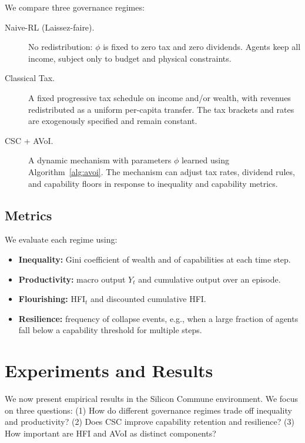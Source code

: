 \documentclass{article}
\begin{document}
We compare three governance regimes:

\begin{description}
  \item[Naive-RL (Laissez-faire).] No redistribution: $\phi$ is fixed to zero tax and zero dividends. Agents keep all income, subject only to budget and physical constraints.
  \item[Classical Tax.] A fixed progressive tax schedule on income and/or wealth, with revenues redistributed as a uniform per-capita transfer. The tax brackets and rates are exogenously specified and remain constant.
  \item[CSC + AVoI.] A dynamic mechanism with parameters $\phi$ learned using Algorithm~\ref{alg:avoi}. The mechanism can adjust tax rates, dividend rules, and capability floors in response to inequality and capability metrics.
\end{description}

\subsection{Metrics}
\label{subsec:metrics}

We evaluate each regime using:

\begin{itemize}
  \item \textbf{Inequality:} Gini coefficient of wealth and of capabilities at each time step.
  \item \textbf{Productivity:} macro output $Y_t$ and cumulative output over an episode.
  \item \textbf{Flourishing:} HFI$_t$ and discounted cumulative HFI.
  \item \textbf{Resilience:} frequency of collapse events, e.g., when a large fraction of agents fall below a capability threshold for multiple steps.
\end{itemize}

\section{Experiments and Results}
\label{sec:experiments}

We now present empirical results in the Silicon Commune environment. We focus on three questions: (1) How do different governance regimes trade off inequality and productivity? (2) Does CSC improve capability retention and resilience? (3) How important are HFI and AVoI as distinct components?
\end{document}
